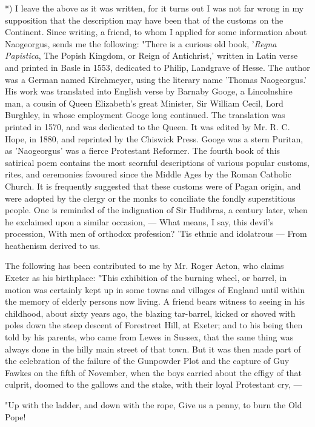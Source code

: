 \documentclass[a4paper, 11pt, oneside, polutonikogreek, english]{article}
\begin{document}
*) I leave the above as it was written, for it turns out I was not far wrong in my supposition that the description may have been that of the customs on the Continent. Since writing, a friend, to whom I applied for some information about Naogeorgus, sends me the following: "There is a curious old book, '\emph{Regna Papistica}, The Popish Kingdom, or Reign of Antichrist,' written in Latin verse and printed in Basle in 1553, dedicated to Philip, Landgrave of Hesse. The author was a German named Kirchmeyer, using the literary name 'Thomas Naogeorgus.' His work was translated into English verse by Barnaby Googe, a Lincolnshire man, a cousin of Queen Elizabeth's great Minister, Sir William Cecil, Lord Burghley, in whose employment Googe long continued. The translation was printed in 1570, and was dedicated to the Queen. It was edited by Mr. R. C. Hope, in 1880, and reprinted by the Chiswick Press. Googe was a stern Puritan, as 'Naogeorgus' was a fierce Protestant Reformer. The fourth book of this satirical poem contains the most scornful descriptions of various popular customs, rites, and ceremonies favoured since the Middle Ages by the Roman Catholic Church. It is frequently suggested that these customs were of Pagan origin, and were adopted by the clergy or the monks to conciliate the fondly superstitious people. One is reminded of the indignation of Sir Hudibras, a century later, when he exclaimed upon a similar occasion, ---  
What means, I say, this devil's procession,  
With men of orthodox profession?  
'Tis ethnic and idolatrous ---  
From heathenism derived to us.

The following has been contributed to me by Mr. Roger Acton, who claims Exeter as his birthplace: "This exhibition of the burning wheel, or barrel, in motion was certainly kept up in some towns and villages of England until within the memory of elderly persons now living. A friend bears witness to seeing in his childhood, about sixty years ago, the blazing tar-barrel, kicked or shoved with poles down the steep descent of Forestreet Hill, at Exeter; and to his being then told by his parents, who came from Lewes in Sussex, that the same thing was always done in the hilly main street of that town. But it was then made part of the celebration of the failure of the Gunpowder Plot and the capture of Guy Fawkes on the fifth of November, when the boys carried about the effigy of that culprit, doomed to the gallows and the stake, with their loyal Protestant cry, ---

"Up with the ladder, and down with the rope,  
Give us a penny, to burn the Old Pope!
\end{document}
